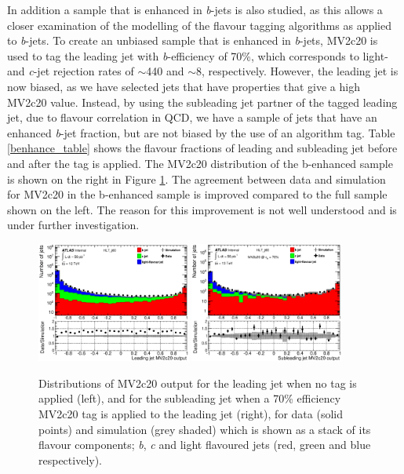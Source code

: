 \documentclass[12pt, onecolumn,notitlepage]{article}
\begin{document}
In addition a sample that is enhanced in \textit{b}-jets is also studied, as this allows a closer examination of the 
modelling of the flavour tagging algorithms as applied to \textit{b}-jets.
To create an unbiased sample that is enhanced in \textit{b}-jets, MV2c20 is used to tag the leading jet with \textit{b}-efficiency of 70\%, which corresponds
to light- and \textit{c}-jet rejection rates of $\sim$440 and $\sim$8, respectively. 
However, the leading jet is now biased, as we have selected jets that have properties that give a high MV2c20 value.
Instead, by using the subleading jet partner of the tagged leading jet, due to flavour correlation in QCD, we have a sample of jets that have an enhanced \textit{b}-jet fraction,
but are not biased by the use of an algorithm tag.
Table \ref{benhance_table} shows the flavour fractions of leading and subleading jet before and after the tag is applied.
The MV2c20 distribution of the b-enhanced sample is shown on the right in Figure \ref{MV2}. The agreement between data and simulation 
for MV2c20 in the b-enhanced sample is improved compared to the full sample shown on the left. 
The reason for this improvement is not well understood and is under further investigation.



\begin{figure}[!htb]
	 \includegraphics[width=0.45\textwidth]{plots/LeadingJet/mv2c20.eps}
	 \includegraphics[width=0.45\textwidth]{plots/bEnhance_70_SubLeadingJet/mv2c20_sublead.eps}
	 \caption{Distributions of MV2c20 output for the leading jet when no tag is applied (left), 
           and for the subleading jet when a 70\% efficiency MV2c20 tag is applied to the leading jet (right),
           for data (solid points) and simulation (grey shaded) 
           which is shown as a stack of its flavour components; \textit{b}, \textit{c} and light flavoured jets (red, green and blue respectively).}
         \label{MV2}
\end{figure}
\end{document}

